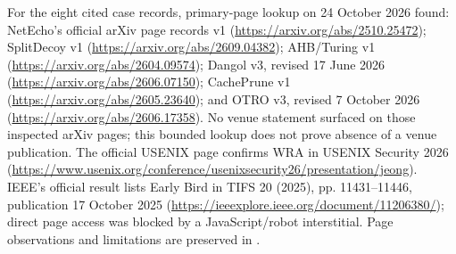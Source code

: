 For the eight cited case records, primary-page lookup on 24 October 2026 found: NetEcho's official arXiv page records v1 (\url{https://arxiv.org/abs/2510.25472}); SplitDecoy v1 (\url{https://arxiv.org/abs/2609.04382}); AHB/Turing v1 (\url{https://arxiv.org/abs/2604.09574}); Dangol v3, revised 17 June 2026 (\url{https://arxiv.org/abs/2606.07150}); CachePrune v1 (\url{https://arxiv.org/abs/2605.23640}); and OTRO v3, revised 7 October 2026 (\url{https://arxiv.org/abs/2606.17358}). No venue statement surfaced on those inspected arXiv pages; this bounded lookup does not prove absence of a venue publication. The official USENIX page confirms WRA in USENIX Security 2026 (\url{https://www.usenix.org/conference/usenixsecurity26/presentation/jeong}). IEEE's official result lists Early Bird in TIFS 20 (2025), pp. 11431--11446, publication 17 October 2025 (\url{https://ieeexplore.ieee.org/document/11206380/}); direct page access was blocked by a JavaScript/robot interstitial. Page observations and limitations are preserved in .


